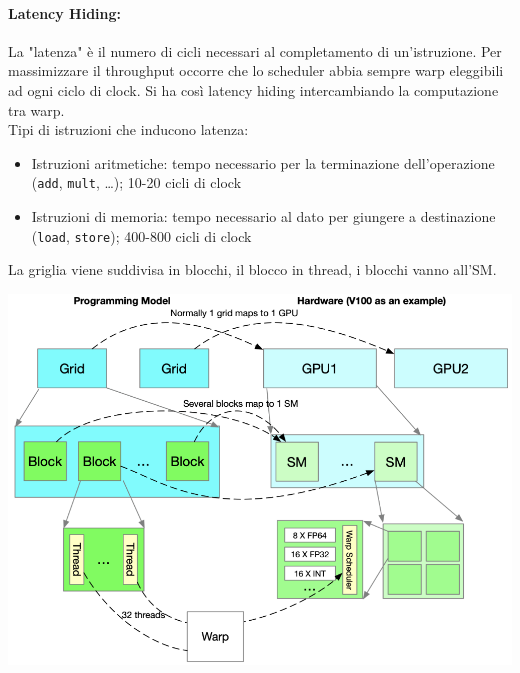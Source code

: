 \paragraph{Latency Hiding:} La "latenza"  è il numero di cicli necessari al completamento di un'istruzione. Per massimizzare il throughput occorre che lo scheduler abbia sempre warp eleggibili ad ogni ciclo di clock. Si ha così latency hiding intercambiando la computazione tra warp.\\
Tipi di istruzioni che inducono latenza: 
\begin{itemize}
	\item Istruzioni aritmetiche: tempo necessario per la terminazione dell'operazione (\texttt{add}, \texttt{mult}, \dots); 10-20 cicli di clock
	\item Istruzioni di memoria: tempo necessario al dato per giungere a destinazione (\texttt{load}, \texttt{store}); 400-800 cicli di clock
\end{itemize}
La griglia viene suddivisa in blocchi, il blocco in thread, i blocchi vanno all'SM.
\begin{center}
	\includegraphics[width=0.85\linewidth]{img/cuda/modelandhwstruct}
\end{center}


\newpage

